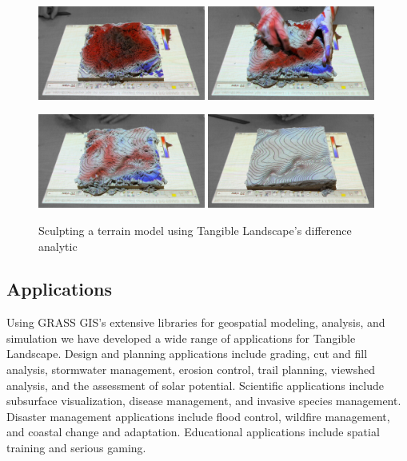 \documentclass[prodmode,acmtochi]{acmsmall} %
\begin{document}
\begin{figure}[h!]
\begin{center}
		\includegraphics[width=0.49\textwidth]{images/difference/tl_difference_1.jpg}
		\includegraphics[width=0.49\textwidth]{images/difference/tl_difference_2.jpg}\vspace*{0.2em}
		
		\includegraphics[width=0.49\textwidth]{images/difference/tl_difference_3.jpg}
		\includegraphics[width=0.49\textwidth]{images/difference/tl_difference_4.jpg}
	\caption{Sculpting a terrain model using Tangible Landscape's difference analytic}
	\label{fig:difference_sequence}
\end{center}
\end{figure}

\subsection{Applications}
Using GRASS GIS's extensive libraries for geospatial modeling, analysis, and simulation 
we have developed a wide range of applications for Tangible Landscape.
Design and planning applications include
grading, cut and fill analysis, stormwater management, erosion control, 
trail planning, viewshed analysis, and the assessment of solar potential. 
Scientific applications include
subsurface visualization, disease management, and invasive species management.
Disaster management applications include 
flood control, wildfire management, and coastal change and adaptation. 
Educational applications include
spatial training and serious gaming.
\end{document}
